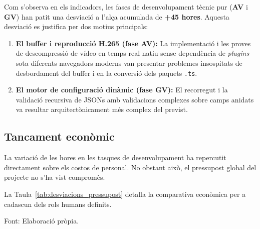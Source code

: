 Com s'observa en els indicadors, les fases de desenvolupament tècnic pur (\textbf{AV} i \textbf{GV}) han patit una desviació a l'alça acumulada de \textbf{+45 hores}. Aquesta desviació es justifica per dos motius principals:
\begin{enumerate}
    \item \textbf{El buffer i reproducció H.265 (fase AV):} La implementació i les proves de descompressió de vídeo en temps real natiu sense dependència de \textit{plugins} sota diferents navegadors moderns van presentar problemes insospitats de desbordament del buffer i en la conversió dels paquets \texttt{.ts}.
    \item \textbf{El motor de configuració dinàmic (fase GV):} El recorregut i la validació recursiva de JSONs amb validacions complexes sobre camps anidats va resultar arquitectònicament més complex del previst.
\end{enumerate}

\subsection{Tancament econòmic}
La variació de les hores en les tasques de desenvolupament ha repercutit directament sobre els costos de personal. No obstant això, el pressupost global del projecte no s'ha vist compromès.

La Taula~\ref{tab:desviacions_pressupost} detalla la comparativa econòmica per a cadascun dels rols humans definits.

\clearpage
\begin{table}[htbp]
  \centering
  \caption{Comparativa del cost de recursos humans estimat enfront de l'executat real.}
  \label{tab:desviacions_pressupost}
  \par\smallskip
  \small Font: Elaboració pròpia.
\end{table}

